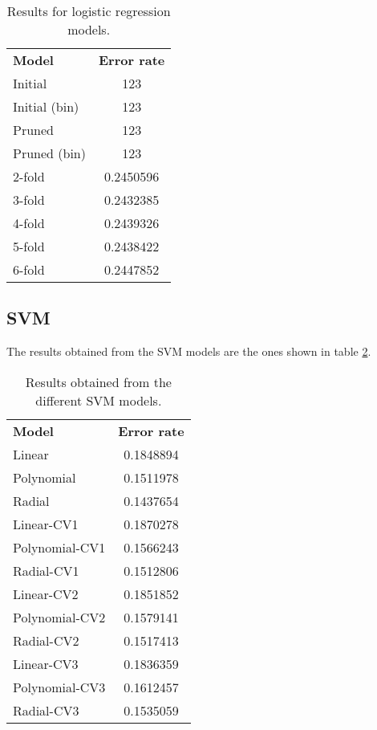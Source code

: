 \documentclass[english]{scrartcl}
\begin{document}
    \begin{table}[h]
    \centering
    \begin{tabular}{l c}
    \textbf{Model} & \textbf{Error rate} \\
    Initial & 123 \\
    Initial (bin) & 123 \\
    Pruned & 123 \\
    Pruned (bin) & 123 \\
    2-fold & 0.2450596 \\
    3-fold & 0.2432385 \\
    4-fold & 0.2439326 \\
    5-fold & 0.2438422 \\
    6-fold & 0.2447852 \\
    \end{tabular}
    \caption{Results for logistic regression models.}
    \label{table:logit-results}
    \end{table}
    
        
    \subsection{SVM}
    The results obtained from the SVM models are the ones shown in table \ref{table:svm-results}.
    
    \begin{table}[h]
    \centering
    \begin{tabular}{l c}
    \textbf{Model} & \textbf{Error rate} \\
    Linear & 0.1848894 \\
	Polynomial & 0.1511978 \\
	Radial & 0.1437654 \\
	Linear-CV1 & 0.1870278 \\
	Polynomial-CV1 & 0.1566243 \\
	Radial-CV1 & 0.1512806 \\
	Linear-CV2 & 0.1851852 \\
	Polynomial-CV2 & 0.1579141 \\
	Radial-CV2 & 0.1517413 \\
	Linear-CV3 & 0.1836359 \\
	Polynomial-CV3 & 0.1612457 \\
	Radial-CV3 & 0.1535059 \\
    \end{tabular}
    \caption{Results obtained from the different SVM models.}
    \label{table:svm-results}
    \end{table}
    
\end{document}
